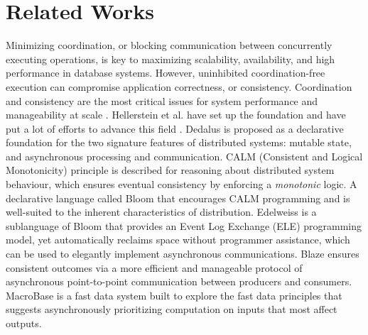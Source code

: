 \section{Related Works}
\label{sec:related}

 Minimizing coordination, or blocking communication between concurrently executing operations, is key to maximizing scalability, availability, and high performance in database systems. However, uninhibited coordination-free execution can compromise application correctness, or consistency. Coordination and consistency are the most critical issues for system performance and manageability at scale \cite{Bailis:2014:CAD:2735508.2735509}. Hellerstein et al. have set up the foundation \cite{Hellerstein:2010:DIE:1860702.1860704} and have put a lot of efforts to advance this field \cite{Alvaro:2013:CWB:2523616.2523632,Bailis:2014:QEC:2632661.2632792}. Dedalus \cite{Alvaro:2010:DDT:2185923.2185942} is proposed as a declarative foundation for the two signature features of distributed systems: mutable state, and asynchronous processing and communication. CALM (Consistent and Logical Monotonicity) principle \cite{calm} is described for reasoning about distributed system behaviour, which ensures eventual consistency by enforcing a \emph{monotonic} logic. A declarative language called Bloom \cite{Conway:2012:LLD:2391229.2391230} that encourages CALM programming and is well-suited to the inherent characteristics of distribution. Edelweiss \cite{Conway:2014:EAS:2732279.2732285} is a sublanguage of Bloom that provides an Event Log Exchange (ELE) programming model, yet automatically reclaims space without programmer assistance, which can be used to elegantly implement asynchronous communications. Blaze \cite{blaze} ensures consistent outcomes via a more efficient and manageable protocol of asynchronous point-to-point communication between producers and consumers. MacroBase \cite{Bailis:2017:MPA:3035918.3035928} is a fast data system built to explore the fast data principles that suggests asynchronously prioritizing computation on inputs that most affect outputs.




